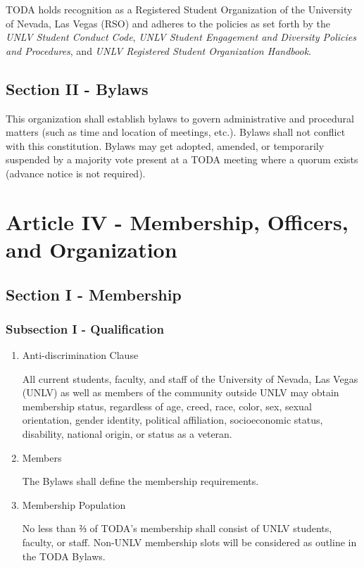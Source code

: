 \documentclass[11pt]{article}
\begin{document}
TODA holds recognition as a Registered Student Organization of the University of Nevada, Las Vegas (RSO) and adheres to the policies as set forth by the \emph{UNLV Student Conduct Code}, \emph{UNLV Student Engagement and Diversity Policies and Procedures}, and \emph{UNLV Registered Student Organization Handbook}.

\subsection{Section II - Bylaws}
\label{sec:org8f1bcbc}

This organization shall establish bylaws to govern administrative and procedural matters (such as time and location of meetings, etc.). 
Bylaws shall not conflict with this constitution. 
Bylaws may get adopted, amended, or temporarily suspended by a majority vote present at a TODA meeting where a quorum exists (advance notice is not required).

\section{Article IV - Membership, Officers, and Organization}
\label{sec:org78fa87f}

\subsection{Section I - Membership}
\label{sec:org37fb172}

\subsubsection{Subsection I - Qualification}
\label{sec:org4a4e8be}

\begin{enumerate}
\item Anti-discrimination Clause
\label{sec:org6b57b16}

All current students, faculty, and staff of the University of Nevada, Las Vegas (UNLV) as well as members of the community outside UNLV may obtain membership status, regardless of age, creed, race, color, sex, sexual orientation, gender identity, political affiliation, socioeconomic status, disability, national origin, or status as a veteran.

\item Members
\label{sec:orgeb0ed6a}

The Bylaws shall define the membership requirements.

\item Membership Population
\label{sec:orga5e37ae}

No less than ⅔ of TODA’s membership shall consist of UNLV students, faculty, or staff. 
Non-UNLV membership slots will be considered as outline in the TODA Bylaws.
\end{enumerate}
\end{document}
